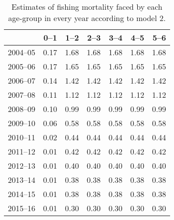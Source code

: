 \begin{table}[ht]
\centering
\begin{tabular}{rrrrrrr}
  \hline
 & 0--1 & 1--2 & 2--3 & 3--4 & 4--5 & 5--6 \\ 
  \hline
2004--05 & 0.17 & 1.68 & 1.68 & 1.68 & 1.68 & 1.68 \\ 
  2005--06 & 0.17 & 1.65 & 1.65 & 1.65 & 1.65 & 1.65 \\ 
  2006--07 & 0.14 & 1.42 & 1.42 & 1.42 & 1.42 & 1.42 \\ 
  2007--08 & 0.11 & 1.12 & 1.12 & 1.12 & 1.12 & 1.12 \\ 
  2008--09 & 0.10 & 0.99 & 0.99 & 0.99 & 0.99 & 0.99 \\ 
  2009--10 & 0.06 & 0.58 & 0.58 & 0.58 & 0.58 & 0.58 \\ 
  2010--11 & 0.02 & 0.44 & 0.44 & 0.44 & 0.44 & 0.44 \\ 
  2011--12 & 0.01 & 0.42 & 0.42 & 0.42 & 0.42 & 0.42 \\ 
  2012--13 & 0.01 & 0.40 & 0.40 & 0.40 & 0.40 & 0.40 \\ 
  2013--14 & 0.01 & 0.38 & 0.38 & 0.38 & 0.38 & 0.38 \\ 
  2014--15 & 0.01 & 0.38 & 0.38 & 0.38 & 0.38 & 0.38 \\ 
  2015--16 & 0.01 & 0.30 & 0.30 & 0.30 & 0.30 & 0.30 \\ 
   \hline
\end{tabular}
\caption{Estimates of fishing mortality faced by each age-group in every year according to model 2.} 
\label{tab:Mod2-FishingMortality}
\end{table}
